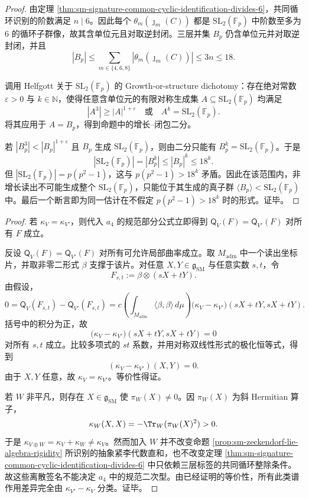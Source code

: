 \begin{proof}
由定理 \ref{thm:sm-signature-common-cyclic-identification-divides-6}，共同循环识别的阶数满足 \(n\mid 6\)。因此每个 \(\theta_m(\jmath_m(C))\) 都是 \(\mathrm{SL}_2(\mathbb F_p)\) 中阶数至多为 \(6\) 的循环子群像，故其含单位元且对取逆封闭。三层并集 \(B_p\) 仍含单位元并对取逆封闭，并且
\[
|B_p|\le \sum_{m\in\{4,6,8\}}|\theta_m(\jmath_m(C))|\le 3n\le 18.
\]

调用 Helfgott 关于 \(\mathrm{SL}_2(\mathbb F_p)\) 的 Growth-or-structure dichotomy：存在绝对常数 \(\varepsilon>0\) 与 \(k\in\mathbb N\)，使得任意含单位元的有限对称生成集 \(A\subseteq \mathrm{SL}_2(\mathbb F_p)\) 均满足
\[
|A^3|\ge |A|^{1+\varepsilon}
\quad\text{或}\quad
A^k=\mathrm{SL}_2(\mathbb F_p).
\]
将其应用于 \(A=B_p\)，得到命题中的增长--闭包二分。

若 \(|B_p^3|<|B_p|^{1+\varepsilon}\) 且 \(B_p\) 生成 \(\mathrm{SL}_2(\mathbb F_p)\)，则由二分只能有 \(B_p^k=\mathrm{SL}_2(\mathbb F_p)\)。于是
\[
|\mathrm{SL}_2(\mathbb F_p)|=|B_p^k|\le |B_p|^k\le 18^k.
\]
但 \(|\mathrm{SL}_2(\mathbb F_p)|=p(p^2-1)\)，这与 \(p(p^2-1)>18^k\) 矛盾。因此在该范围内，非增长读出不可能生成整个 \(\mathrm{SL}_2(\mathbb F_p)\)，只能位于其生成的真子群 \(\langle B_p\rangle<\mathrm{SL}_2(\mathbb F_p)\) 中。最后一个断言即为同一估计在不假定 \(p(p^2-1)>18^k\) 时的形式。证毕。
\end{proof}

\begin{proof}
若 \(\kappa_V=\kappa_{V'}\)，则代入 \(a_4\) 的规范部分公式立即得到 \(\mathsf Q_V(F)=\mathsf Q_{V'}(F)\) 对所有 \(F\) 成立。

反设 \(\mathsf Q_V(F)=\mathsf Q_{V'}(F)\) 对所有可允许局部曲率成立。取 \(M_{\mathrm{adm}}\) 中一个读出坐标片，并取非零二形式 \(\beta\) 支撑于该片。对任意 \(X,Y\in\mathfrak g_{\mathrm{SM}}\) 与任意实数 \(s,t\)，令
\[
F_{s,t}:=\beta\otimes(sX+tY).
\]
由假设，
\[
0=\mathsf Q_V(F_{s,t})-\mathsf Q_{V'}(F_{s,t})
=c\left(\int_{M_{\mathrm{adm}}}\langle\beta,\beta\rangle\,d\mu\right)
\bigl(\kappa_V-\kappa_{V'}\bigr)(sX+tY,sX+tY).
\]
括号中的积分为正，故
\[
\bigl(\kappa_V-\kappa_{V'}\bigr)(sX+tY,sX+tY)=0
\]
对所有 \(s,t\) 成立。比较多项式的 \(st\) 系数，并用对称双线性形式的极化恒等式，得到
\[
(\kappa_V-\kappa_{V'})(X,Y)=0.
\]
由于 \(X,Y\) 任意，故 \(\kappa_V=\kappa_{V'}\)。等价性得证。

若 \(W\) 非平凡，则存在 \(X\in\mathfrak g_{\mathrm{SM}}\) 使 \(\pi_W(X)\ne0\)。因 \(\pi_W(X)\) 为斜 Hermitian 算子，
\[
\kappa_W(X,X)=-\Tr_W(\pi_W(X)^2)>0.
\]
于是 \(\kappa_{V\oplus W}=\kappa_V+\kappa_W\ne\kappa_V\)。然而加入 \(W\) 并不改变命题 \ref{prop:sm-zeckendorf-lie-algebra-rigidity} 所识别的抽象紧李代数直和，也不改变定理 \ref{thm:sm-signature-common-cyclic-identification-divides-6} 中只依赖三层标签的共同循环整除条件。故这些离散签名不能决定 \(a_4\) 中的规范二次型。由已经证明的等价性，所有此类谱作用差异完全由 \(\kappa_{V'}-\kappa_V\) 分类。证毕。
\end{proof}

